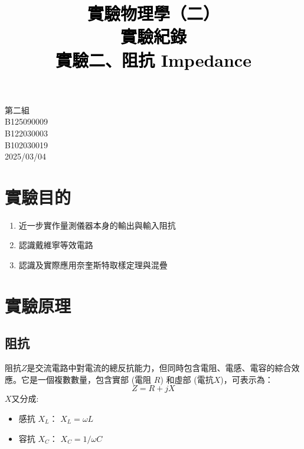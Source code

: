 \documentclass[12pt,a4paper]{article}
\title{\vspace{-0.5cm}
       {\bf \textcolor{black}{{\LARGE 
       \begin{CJK}{UTF8}{bkai}
       實驗物理學（二）\\
       \vspace{6pt}
       實驗紀錄\\
       \vspace{60pt}
       實驗二、阻抗 Impedance
       \end{CJK}
       }}
       }
       }
\author{}
\date{}
\begin{document}
\begin{CJK}{UTF8}{bkai}

\maketitle
\thispagestyle{empty}

\vspace{10cm}
\begin{center}
{\large 第二組}\\ \vspace{12pt}
{\large {} B125090009}\\ \vspace{6pt}
{\large {}  B122030003}\\ \vspace{6pt}
{\large {} B102030019}\\ \vspace{12pt}
{\large 2025/03/04}\\
\end{center}

\clearpage

\section{實驗目的}

\begin{enumerate}
    \item 近一步實作量測儀器本身的輸出與輸入阻抗
    \item 認識戴維寧等效電路
    \item 認識及實際應用奈奎斯特取樣定理與混疊
\end{enumerate}


\section{實驗原理}
\subsection{阻抗}
\hfill

阻抗$Z$是交流電路中對電流的總反抗能力，但同時包含電阻、電感、電容的綜合效應。它是一個複數數量，包含實部 (電阻 $R$) 和虛部 (電抗$X$)，可表示為：
\begin{equation*}
    Z = R + jX
\end{equation*}
$X$又分成:
\begin{itemize}
    \item 感抗 $X_{L}$： $X_{L} = \omega L$
    \item 容抗 $X_{C}$： $X_{C} = 1/\omega C$
\end{itemize}


\end{CJK}
\end{document}
